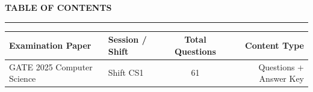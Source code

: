 \documentclass[a4paper,10pt,twoside]{article}
\begin{document}
\newpage

\begin{center}
    {\Large\textbf{TABLE OF CONTENTS}}\\[0.4em]
    \rule{0.5\textwidth}{0.6pt}
\end{center}
\vspace{1em}

\noindent\begin{tabularx}{\linewidth}{|X|l|c|r|}
\hline
\textbf{Examination Paper} & \textbf{Session / Shift} & \textbf{Total Questions} & \textbf{Content Type} \\
\hline

GATE 2025 Computer Science & Shift CS1 & 61 & Questions + Answer Key \\ \hline
\end{tabularx}

\vspace{1.5em}

\newpage
\end{document}
